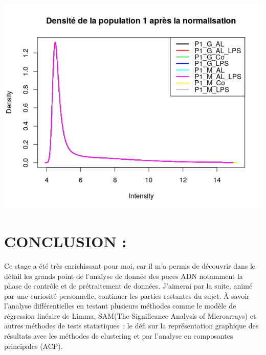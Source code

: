 \documentclass[a4paper,10pt]{article}
\begin{document}
\begin{center}
 \includegraphics[scale=0.5]{../../R/output/Densitypop1C.png}
\end{center}

\section{CONCLUSION :}
Ce stage a été très enrichissant pour moi, car il m’a permis de découvrir dans le détail les grands point de l’analyse de donnée des puces ADN notamment la phase de contrôle et de prétraitement de données.
J’aimerai par la suite, animé par une curiosité personnelle, continuer les parties restantes du sujet. 
À savoir l’analyse différentielles en testant plusieurs méthodes comme le modèle de régression linéaire de Limma, SAM(The Significance Analysis of Microarrays)  et autres méthodes de tests statistiques ; le défi sur la représentation graphique des résultats avec les méthodes de clustering et par l’analyse en composantes principales (ACP).
\end{document}
